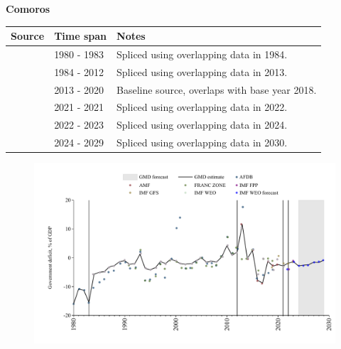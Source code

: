 \documentclass[12pt,a4paper,landscape]{article}
\begin{document}
\begin{adjustbox}{max totalsize={\paperwidth}{\paperheight},center}
\begin{minipage}[t][\textheight][t]{\textwidth}
\vspace*{0.5cm}
{}
\begin{center}
{\Large\bfseries Comoros}
\end{center}
\vspace{0.5cm}
\begin{table}[H]
\centering
\small
\begin{tabular}{|l|l|l|}
\hline
\textbf{Source} & \textbf{Time span} & \textbf{Notes} \\
\hline
\rowcolor{white}\cite{AFDB}& 1980 - 1983 &Spliced using overlapping data in 1984.\\
\rowcolor{lightgray}\cite{IMF_WEO}& 1984 - 2012 &Spliced using overlapping data in 2013.\\
\rowcolor{white}\cite{AMF}& 2013 - 2020 &Baseline source, overlaps with base year 2018.\\
\rowcolor{lightgray}\cite{IMF_WEO}& 2021 - 2021 &Spliced using overlapping data in 2022.\\
\rowcolor{white}\cite{IMF_GFS}& 2022 - 2023 &Spliced using overlapping data in 2024.\\
\rowcolor{lightgray}\cite{IMF_WEO_forecast}& 2024 - 2029 &Spliced using overlapping data in 2030.\\
\hline
\end{tabular}
\end{table}
\begin{figure}[H]
\centering
\includegraphics[width=\textwidth,height=0.6\textheight,keepaspectratio]{graphs/COM_govdef_GDP.pdf}
\end{figure}
\end{minipage}
\end{adjustbox}
\end{document}
